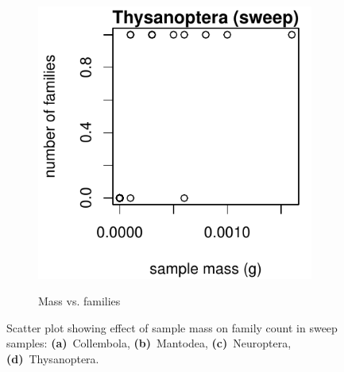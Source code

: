 \documentclass[10pt,letterpaper,twocolumn]{article}
\begin{document}
\begin{figure}[h]
\begin{subfigure}[b]{0.15\textwidth}
		\label{fig:sweep_neuroptera_scatter}
	\end{subfigure}
	~
	\begin{subfigure}[b]{0.15\textwidth}
		\caption{Mass vs. families}
		\includegraphics[width=\textwidth]{plots/mass-vs-count/scatter/2015_sweep_Thysanoptera_mass-vs-count.pdf}
		\label{fig:sweep_thysanoptera_scatter}
	\end{subfigure}
	\caption{Scatter plot showing effect of sample mass on family count in sweep samples: \textbf{(a)}~Collembola, \textbf{(b)}~Mantodea, \textbf{(c)}~Neuroptera, \textbf{(d)}~Thysanoptera.}
	\label{fig:sweep_incomplete}
	\smallskip
	\nointerlineskip
	\hrulefill
\end{figure}

\clearpage
\newpage
\end{document}
